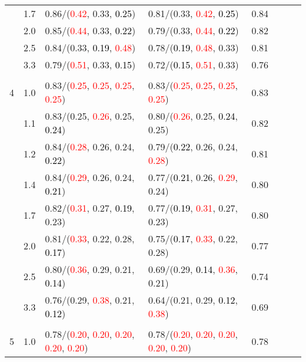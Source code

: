 \documentclass[10pt,a4paper]{report}
\begin{document}
\begin{table}[!htbp]
\begin{center}
{\begin{tabular}{ccllcccc}
			&1.7&0.86/(\textcolor{red}{0.42}, 0.33, \textcolor{black}{0.25})&0.81/(0.33, \textcolor{red}{0.42}, \textcolor{black}{0.25})&0.84\\
			&2.0&0.85/(\textcolor{red}{0.44}, 0.33, \textcolor{black}{0.22})&0.79/(0.33, \textcolor{red}{0.44}, \textcolor{black}{0.22})&0.82\\
			&2.5&0.84/(0.33, \textcolor{black}{0.19}, \textcolor{red}{0.48})&0.78/(\textcolor{black}{0.19}, \textcolor{red}{0.48}, 0.33)&0.81\\
			&3.3&0.79/(\textcolor{red}{0.51}, 0.33, \textcolor{black}{0.15})&0.72/(\textcolor{black}{0.15}, \textcolor{red}{0.51}, 0.33)&0.76\\
			&&&&\\
			4			&1.0&0.83/(\textcolor{red}{0.25}, \textcolor{red}{0.25}, \textcolor{red}{0.25}, \textcolor{red}{0.25})&0.83/(\textcolor{red}{0.25}, \textcolor{red}{0.25}, \textcolor{red}{0.25}, \textcolor{red}{0.25})&0.83\\
			&1.1&0.83/(0.25, \textcolor{red}{0.26}, 0.25, \textcolor{black}{0.24})&0.80/(\textcolor{red}{0.26}, 0.25, \textcolor{black}{0.24}, 0.25)&0.82\\
			&1.2&0.84/(\textcolor{red}{0.28}, 0.26, 0.24, \textcolor{black}{0.22})&0.79/(\textcolor{black}{0.22}, 0.26, 0.24, \textcolor{red}{0.28})&0.81\\
			&1.4&0.84/(\textcolor{red}{0.29}, 0.26, 0.24, \textcolor{black}{0.21})&0.77/(\textcolor{black}{0.21}, 0.26, \textcolor{red}{0.29}, 0.24)&0.80\\
			&1.7&0.82/(\textcolor{red}{0.31}, 0.27, \textcolor{black}{0.19}, 0.23)&0.77/(\textcolor{black}{0.19}, \textcolor{red}{0.31}, 0.27, 0.23)&0.80\\
			&2.0&0.81/(\textcolor{red}{0.33}, 0.22, 0.28, \textcolor{black}{0.17})&0.75/(\textcolor{black}{0.17}, \textcolor{red}{0.33}, 0.22, 0.28)&0.77\\
			&2.5&0.80/(\textcolor{red}{0.36}, 0.29, 0.21, \textcolor{black}{0.14})&0.69/(0.29, \textcolor{black}{0.14}, \textcolor{red}{0.36}, 0.21)&0.74\\
			&3.3&0.76/(0.29, \textcolor{red}{0.38}, 0.21, \textcolor{black}{0.12})&0.64/(0.21, 0.29, \textcolor{black}{0.12}, \textcolor{red}{0.38})&0.69\\
			&&&&\\
			5			&1.0&0.78/(\textcolor{red}{0.20}, \textcolor{red}{0.20}, \textcolor{red}{0.20}, \textcolor{red}{0.20}, \textcolor{red}{0.20})&0.78/(\textcolor{red}{0.20}, \textcolor{red}{0.20}, \textcolor{red}{0.20}, \textcolor{red}{0.20}, \textcolor{red}{0.20})&0.78\\

\end{tabular}}
\end{center}
\end{table}
\end{document}
